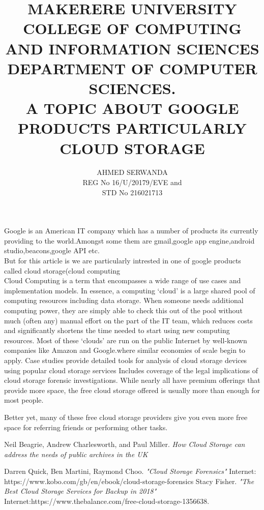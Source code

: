 \documentclass[12pt]{article}
\begin{document}
\title{MAKERERE UNIVERSITY\\COLLEGE OF COMPUTING AND INFORMATION SCIENCES\\DEPARTMENT OF COMPUTER SCIENCES.\\A TOPIC ABOUT GOOGLE PRODUCTS PARTICULARLY CLOUD STORAGE}
\author{AHMED SERWANDA\\
       REG No 16/U/20179/EVE and\\ STD No 216021713}
\maketitle
\newpage
\begin{section}
Google is an American IT company which has a number of products its currently providing to the world.Amongst some them are gmail,google app engine,android studio,beacons,google API etc.\\But for this article is we are particularly intrested in one of google products called cloud storage(cloud computing\\
Cloud Computing is a term that encompasses a wide range of use cases and implementation models. In
essence, a computing ‘cloud’ is a large shared pool of computing resources including data storage. When
someone needs additional computing power, they are simply able to check this out of the pool without
much (often any) manual effort on the part of the IT team, which reduces costs and significantly shortens
the time needed to start using new computing resources. Most of these ‘clouds’ are run on the public
Internet by well-known companies like Amazon and Google.where similar economies of scale begin to
apply.\cite{neil}
Case studies provide detailed tools for analysis of cloud storage devices using popular cloud storage services
Includes coverage of the legal implications of cloud storage forensic investigations.\cite{darren}
While nearly all have premium offerings that provide more space, the free cloud storage offered is usually more than enough for most people.

Better yet, many of these free cloud storage providers give you even more free space for referring friends or performing other tasks.\cite{stacy}
\end{section}

\begin{thebibliography}{9}
   Neil Beagrie, Andrew Charlesworth, and Paul Miller. \textit{How Cloud Storage can address the needs of public archives in the UK}
 
 Darren Quick, Ben Martini, Raymond Choo. \textit{"Cloud Storage Forensics"} 
Internet: https://www.kobo.com/gb/en/ebook/cloud-storage-forensics 
 Stacy Fisher. \textit{"The Best Cloud Storage Services for Backup in 2018"} 
Internet:https://www.thebalance.com/free-cloud-storage-1356638.


 \end{thebibliography} 
\end{document}
